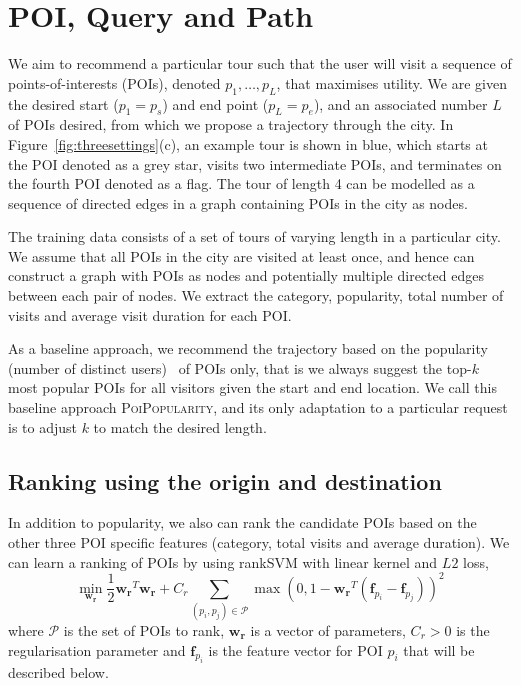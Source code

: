 \section{POI, Query and Path}
\label{sec:method}


We aim to recommend a particular tour such that the user will visit a sequence of points-of-interests (POIs), denoted $p_1, \ldots, p_L$, that maximises utility. We are given the desired start ($p_1=p_s$) and end point ($p_L=p_e$), and an associated number $L$ of POIs desired, from which we propose a trajectory through the city. In Figure~\ref{fig:threesettings}(c), an example tour is shown in blue, which starts at the POI denoted as a grey star, visits two intermediate POIs, and terminates on the fourth POI denoted as a flag. The tour of length 4 can be modelled as a sequence of directed edges in a graph containing POIs in the city as nodes.

The training data consists of a set of tours of varying length in a particular city. We assume that all POIs in the city are visited at least once, and hence can construct a graph with POIs as nodes and potentially multiple directed edges between each pair of nodes. We extract the category, popularity, total number of visits and average visit duration for each POI.

As a baseline approach, we recommend the trajectory based on the popularity (number of distinct users)~\cite{ht10} of POIs only, that is we always suggest the top-$k$ most popular POIs for all visitors given the start and end location. We call this baseline approach \textsc{PoiPopularity}, and its only adaptation to a particular request is to adjust $k$ to match the desired length.

\subsection{Ranking using the origin and destination}
\label{sec:ranksvm}

In addition to popularity, we also can rank the candidate POIs based on the other three POI specific features (category, total visits and average duration).
We can learn a ranking of POIs by using rankSVM with linear kernel and $L2$ loss\cite{lranksvm},
\begin{displaymath}
\min_{\mathbf{w_r}} \frac{1}{2} \mathbf{w_r}^T \mathbf{w_r} +
                    C_r \sum_{(p_i, p_j) \in \mathcal{P}}
                    \max \left( 0, 1 - \mathbf{w_r}^T (\mathbf{f}_{p_i} - \mathbf{f}_{p_j}) \right)^2
\end{displaymath}
where $\mathcal{P}$ is the set of POIs to rank,
$\mathbf{w_r}$ is a vector of parameters,
$C_r > 0$ is the regularisation parameter and
$\mathbf{f}_{p_i}$ is the feature vector for POI $p_i$ that will be described below.


